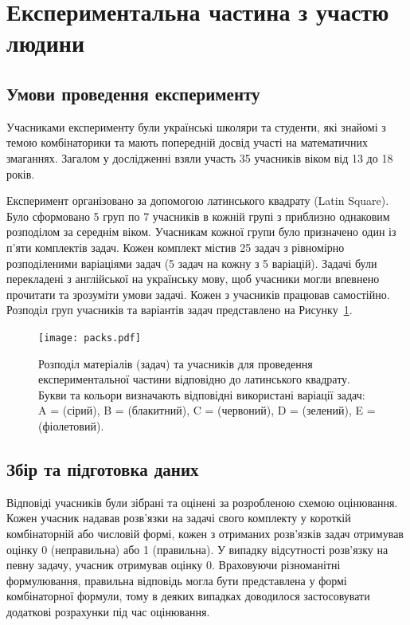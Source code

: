 \section{Експериментальна частина з участю людини}
\label{sec:human-experiment-set-up}

\subsection{Умови проведення експерименту}

Учасниками експерименту були українські школяри та студенти, які знайомі з темою комбінаторики та мають попередній досвід участі на математичних змаганнях. Загалом у дослідженні взяли участь 35 учасників віком від 13 до 18 років.

Експеримент організовано за допомогою латинського квадрату (Latin Square). Було сформовано 5 груп по 7 учасників в кожній групі з приблизно однаковим розподілом за середнім віком. Учасникам кожної групи було призначено один із п'яти комплектів задач. Кожен комплект містив 25 задач з рівномірно розподіленими варіаціями задач (5 задач на кожну з 5 варіацій). Задачі були перекладені з англійської на українську мову, щоб учасники могли впевнено прочитати та зрозуміти умови задачі. Кожен з учасників працював самостійно. Розподіл груп учасників та варіантів задач представлено на Рисунку~\ref{fig:packs}.

\begin{figure}
    \centering
    \texttt{[image: packs.pdf]}
    \caption{Розподіл матеріалів (задач) та учасників для проведення експериментальної частини відповідно до латинського квадрату. Букви та кольори визначають відповідні використані варіації задач: A =  (сірий), B =  (блакитний), C =  (червоний), D =  (зелений), E =  (фіолетовий).}
    \label{fig:packs}
\end{figure}

\subsection{Збір та підготовка даних}

Відповіді учасників були зібрані та оцінені за розробленою схемою оцінювання. Кожен учасник надавав розв'язки на задачі свого комплекту у короткій комбінаторній або числовій формі, кожен з отриманих розв'язків задач отримував оцінку 0 (неправильна) або 1 (правильна). У випадку відсутності розв'язку на певну задачу, учасник отримував оцінку 0. Враховуючи різноманітні формулювання, правильна відповідь могла бути представлена у формі комбінаторної формули, тому в деяких випадках доводилося застосовувати додаткові розрахунки під час оцінювання.

